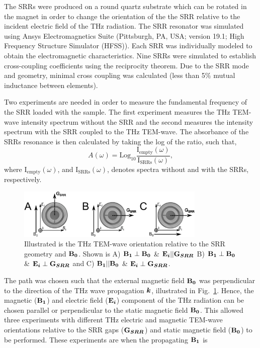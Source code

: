 The SRRs were produced on a round quartz substrate which can be rotated in the magnet in order to change the orientation of the the SRR relative to the incident electric field of the THz radiation. The SRR resonator was simulated using Ansys Electromagnetics Suite (Pittsburgh, PA, USA; version 19.1; High Frequency Structure Simulator (HFSS)). Each SRR was individually modeled to obtain the electromagnetic characteristics. Nine SRRs were simulated to establish cross-coupling coefficients using the reciprocity theorem. Due to the SRR mode and geometry, minimal cross coupling was calculated (less than 5\% mutual inductance between elements). 

Two experiments are needed in order to measure the fundamental frequency of the SRR loaded with the sample. The first experiment measures the THz TEM-wave intensity spectrum without the SRR and the second measures the intensity spectrum with the SRR coupled to the THz TEM-wave. The absorbance of the SRRs resonance is then calculated by taking the log of the ratio, such that,
\begin{equation}
  A(\omega) = \text{Log}_{10}\frac{\text{I}_{\text{empty}}(\omega)}{\text{I}_{\text{SRRs}}(\omega)},  
\end{equation}
where $\text{I}_{\text{empty}}(\omega)$, and $\text{I}_{\text{SRRs}}(\omega)$, denotes spectra without and with the SRRs, respectively. 


\begin{figure}[htp]
\centering
  \includegraphics[width=0.8\textwidth]{Kapitel/Ch4-Images/Ch4-BeamPath.eps}
  \caption[THz TEM-wave Orientation Relative to SRR]{Illustrated is the THz TEM-wave orientation relative to the SRR geometry and $\textbf{B}\boldsymbol{_{0}}$. Shown is A) $\textbf{B}\boldsymbol{_{1}} \perp \textbf{B}\boldsymbol{_{0}}$ \& $\textbf{E}\boldsymbol{_{i}}||\textbf{G}\boldsymbol{_{SRR}}$ B) $\textbf{B}\boldsymbol{_{1}} \perp \textbf{B}\boldsymbol{_{0}}$ \& $\textbf{E}\boldsymbol{_{i}}\perp\textbf{G}\boldsymbol{_{SRR}}$ and C) $\textbf{B}\boldsymbol{_{1}} || \textbf{B}\boldsymbol{_{0}}$ \& $\textbf{E}\boldsymbol{_{i}}\perp\textbf{G}\boldsymbol{_{SRR}}$.}
  \label{ch4-fig:BeamGEO}
\end{figure}

The path was chosen such that the external magnetic field $\textbf{B}\boldsymbol{_{0}}$ was perpendicular to the direction of the THz wave propagation $\boldsymbol{k}$, illustrated in Fig.~\ref{ch4-fig:BeamGEO}. Hence, the magnetic ($\textbf{B}\boldsymbol{_{1}}$) and electric field ($\textbf{E}\boldsymbol{_{i}}$) component of the THz radiation can be chosen parallel or perpendicular to the static magnetic field $\textbf{B}\boldsymbol{_{0}}$. This allowed three experiments with different THz electric and magnetic TEM-wave orientations relative to the SRR gaps ($\textbf{G}\boldsymbol{_{SRR}}$) and static magnetic field ($\textbf{B}\boldsymbol{_{0}}$) to be performed. These experiments are when the propagating $\textbf{B}\boldsymbol{_{1}}$ is 

